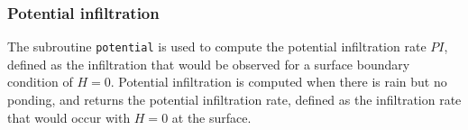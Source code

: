 \documentclass{article}
\newcommand{\code}[1]{\texttt{#1}}
\begin{document}
\subsubsection*{Potential infiltration}

The subroutine \code{potential} is used to compute the potential infiltration rate $PI$, defined as the infiltration that would be observed for a surface boundary condition of $H=0$. 
Potential infiltration is computed when there is rain but no ponding, and returns the potential infiltration rate, defined as the infiltration rate that would occur with $H=0$ at the surface.  



%
%
%
%
%		
%
\end{document}
